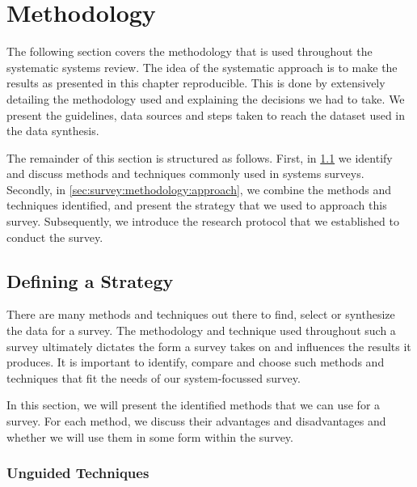 \section{Methodology}
\label{sec:survey:methodology}

The following section covers the methodology that is used throughout the systematic systems review. The idea of the systematic approach is to make the results as presented in this chapter reproducible. This is done by extensively detailing the methodology used and explaining the decisions we had to take. We present the guidelines, data sources and steps taken to reach the dataset used in the data synthesis. 

The remainder of this section is structured as follows. First, in \cref{sec:survey:methodology:strategy} we identify and discuss methods and techniques commonly used in systems surveys. Secondly, in \cref{sec:survey:methodology:approach}, we combine the methods and techniques identified, and present the strategy that we used to approach this survey. Subsequently, we introduce the research protocol that we established to conduct the survey.




\subsection{Defining a Strategy}
\label{sec:survey:methodology:strategy}



There are many methods and techniques out there to find, select or synthesize the data for a survey. The methodology and technique used throughout such a survey ultimately dictates the form a survey takes on and influences the results it produces. It is important to identify, compare and choose such methods and techniques that fit the needs of our system-focussed survey. 

In this section, we will present the identified methods that we can use for a survey. For each method, we discuss their advantages and disadvantages and whether we will use them in some form within the survey.

\subsubsection{Unguided Techniques}
\label{sec:survey:methodology:strategy:unguided}

